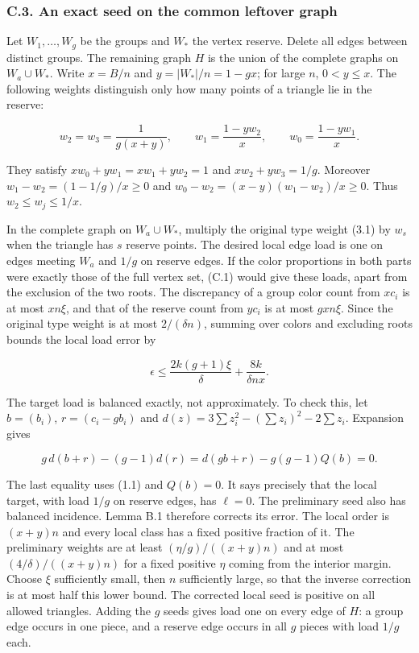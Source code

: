 \documentclass[english,11pt,a4paper]{article}
\begin{document}
\subsubsection{C.3. An exact seed on the common leftover graph}\label{c.3.-an-exact-seed-on-the-common-leftover-graph}

Let \(W_1,\ldots,W_g\) be the groups and \(W_\ast\) the vertex reserve. Delete all edges between distinct groups. The remaining graph \(H\) is the union of the complete graphs on \(W_a\cup W_\ast\). Write \(x=B/n\) and \(y=|W_\ast|/n=1-gx\); for large \(n\), \(0<y\le x\). The following weights distinguish only how many points of a triangle lie in the reserve:

\[w_2=w_3=\frac1{g(x+y)},\qquad w_1=\frac{1-yw_2}{x},\qquad w_0=\frac{1-yw_1}{x}.\tag{C.1}\]

They satisfy \(xw_0+yw_1=xw_1+yw_2=1\) and \(xw_2+yw_3=1/g\). Moreover \(w_1-w_2=(1-1/g)/x\ge0\) and \(w_0-w_2=(x-y)(w_1-w_2)/x\ge0\). Thus \(w_2\le w_j\le1/x\).

In the complete graph on \(W_a\cup W_\ast\), multiply the original type weight (3.1) by \(w_s\) when the triangle has \(s\) reserve points. The desired local edge load is one on edges meeting \(W_a\) and \(1/g\) on reserve edges. If the color proportions in both parts were exactly those of the full vertex set, (C.1) would give these loads, apart from the exclusion of the two roots. The discrepancy of a group color count from \(xc_i\) is at most \(xn\xi\), and that of the reserve count from \(yc_i\) is at most \(gxn\xi\). Since the original type weight is at most \(2/(\delta n)\), summing over colors and excluding roots bounds the local load error by

\[\epsilon\le\frac{2k(g+1)\xi}{\delta}+\frac{8k}{\delta nx}.\tag{C.2}\]

The target load is balanced exactly, not approximately. To check this, let \(b=(b_i)\), \(r=(c_i-gb_i)\) and \(d(z)=3\sum z_i^2-(\sum z_i)^2-2\sum z_i\). Expansion gives

\[g\,d(b+r)-(g-1)d(r)=d(gb+r)-g(g-1)Q(b)=0.\]

The last equality uses (1.1) and \(Q(b)=0\). It says precisely that the local target, with load \(1/g\) on reserve edges, has \(\ell=0\). The preliminary seed also has balanced incidence. Lemma B.1 therefore corrects its error. The local order is \((x+y)n\) and every local class has a fixed positive fraction of it. The preliminary weights are at least \((\eta/g)/((x+y)n)\) and at most \((4/\delta)/((x+y)n)\) for a fixed positive \(\eta\) coming from the interior margin. Choose \(\xi\) sufficiently small, then \(n\) sufficiently large, so that the inverse correction is at most half this lower bound. The corrected local seed is positive on all allowed triangles. Adding the \(g\) seeds gives load one on every edge of \(H\): a group edge occurs in one piece, and a reserve edge occurs in all \(g\) pieces with load \(1/g\) each.
\end{document}
